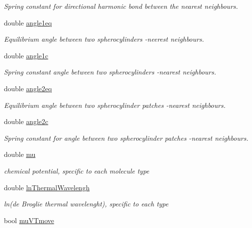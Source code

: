 \begin{DoxyCompactItemize}
\begin{DoxyCompactList}\small\item\em Spring constant for directional harmonic bond between the nearest neighbours. \end{DoxyCompactList}\item 
double \hyperlink{class_molecule_params_aa3a3e60ad09927ad74fce4eb8dbd2a91}{angle1eq}
\begin{DoxyCompactList}\small\item\em Equilibrium angle between two spherocylinders -\/neerest neighbours. \end{DoxyCompactList}\item 
double \hyperlink{class_molecule_params_a01cf1bc0ed829aeca3c1756af5c11841}{angle1c}
\begin{DoxyCompactList}\small\item\em Spring constant angle between two spherocylinders -\/nearest neighbours. \end{DoxyCompactList}\item 
double \hyperlink{class_molecule_params_aba6d4b6e5b9ee2d21f42046d2035b707}{angle2eq}
\begin{DoxyCompactList}\small\item\em Equilibrium angle between two spherocylinder patches -\/nearest neighbours. \end{DoxyCompactList}\item 
double \hyperlink{class_molecule_params_ac5666492fbac2859faf78bd7c5a1afc7}{angle2c}
\begin{DoxyCompactList}\small\item\em Spring constant for angle between two spherocylinder patches -\/nearest neighbours. \end{DoxyCompactList}\item 
double \hyperlink{class_molecule_params_a8155e1f14baf8e128df56a9a71f77de4}{mu}
\begin{DoxyCompactList}\small\item\em chemical potential, specific to each molecule type \end{DoxyCompactList}\item 
double \hyperlink{class_molecule_params_af02735d94bf97e0315d370a1d2dbc675}{ln\+Thermal\+Wavelengh}
\begin{DoxyCompactList}\small\item\em ln(de Broglie thermal wavelenght), specific to each type \end{DoxyCompactList}\item 
bool \hyperlink{class_molecule_params_affad94a2e0a3c67b0f36e08e867974da}{mu\+V\+Tmove}

\end{DoxyCompactItemize}
